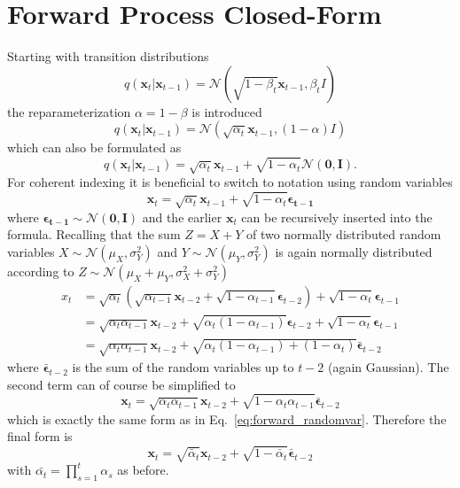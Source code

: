 \section{Forward Process Closed-Form}
\label{app:forward}
Starting with transition distributions
\begin{equation}
    q(\bm{x}_t|\bm{x}_{t-1}) = \mathcal{N}(\sqrt{1-\beta_t} \bm{x}_{t-1}, \beta_t I)
\end{equation}
the reparameterization $\alpha = 1 - \beta$ is introduced
\begin{equation}
    q(\bm{x}_t|\bm{x}_{t-1}) = \mathcal{N}(\sqrt{\alpha_t} \bm{x}_{t-1}, (1-\alpha) I)
\end{equation}
which can also be formulated as
\begin{equation}
    q(\bm{x}_t|\bm{x}_{t-1}) = \sqrt{\alpha_t}\bm{x}_{t-1} + \sqrt{1-\alpha_t}\mathcal{N}(\bm{0}, \bm{I}).
\end{equation}
For coherent indexing it is beneficial to switch to notation using random variables
\begin{equation}
    \bm{x}_{t} = \sqrt{\alpha_t}\bm{x}_{t-1} + \sqrt{1-\alpha_t}\bm{\epsilon_{t-1}}
    \label{eq:forward_randomvar}
\end{equation}
where $\bm{\epsilon_{t-1}} \sim \mathcal{N}(\bm{0}, \bm{I})$ and the earlier $\bm{x}_t$ can be recursively inserted into the formula. Recalling that the sum $Z = X + Y$ of two normally distributed random variables $X \sim \mathcal{N}(\mu_X, \sigma_Y^2)$ and $Y \sim \mathcal{N}(\mu_Y, \sigma_Y^2)$ is again normally distributed according to $Z \sim \mathcal{N}(\mu_X + \mu_Y, \sigma_X^2 + \sigma_Y^2)$
\begin{align}
    x_t & = \sqrt{\alpha_t} \left( \sqrt{\alpha_{t-1}} \bm{x}_{t-2} + \sqrt{1-\alpha_{t-1}}\bm{\epsilon}_{t-2} \right) + \sqrt{1-\alpha_{t}} \bm{\epsilon}_{t-1} \\
        & = \sqrt{\alpha_{t}\alpha_{t-1}} \bm{x}_{t-2} + \sqrt{\alpha_{t}(1-\alpha_{t-1})} \bm{\epsilon}_{t-2} + \sqrt{1-\alpha_{t}} \bm{\epsilon}_{t-1}         \\
        & = \sqrt{\alpha_{t}\alpha_{t-1}} \bm{x}_{t-2} + \sqrt{\alpha_{t}(1-\alpha_{t-1}) + (1-\alpha_{t})} \bm{\bar{\epsilon}}_{t-2}
\end{align}
where $\bm{\bar{\epsilon}}_{t-2}$ is the sum of the random variables up to $t-2$ (again Gaussian). The second term can of course be simplified to
\begin{equation}
    \bm{x}_t = \sqrt{\alpha_{t}\alpha_{t-1}} \bm{x}_{t-2} + \sqrt{1-\alpha_t\alpha_{t-1}} \bm{\bar{\epsilon}}_{t-2}
\end{equation}
which is exactly the same form as in Eq.~\ref{eq:forward_randomvar}. Therefore the final form is
\begin{equation}
    \bm{x}_t = \sqrt{\bar{\alpha}_{t}} \bm{x}_{t-2} + \sqrt{1-\bar{\alpha}_{t}} \bm{\bar{\epsilon}}_{t-2}
\end{equation}
with $\bar{\alpha_t} = \prod_{s=1}^{t}\alpha_s$ as before.